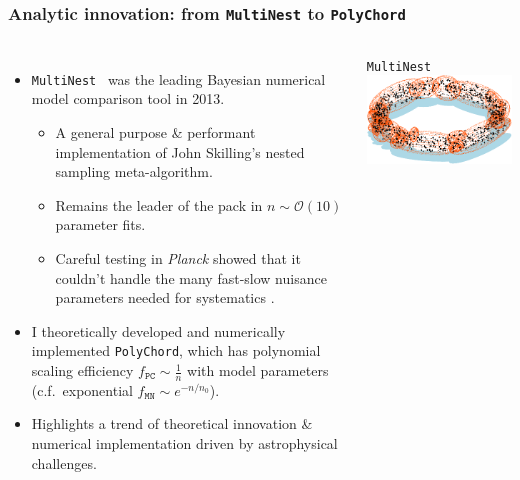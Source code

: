 \documentclass[aspectratio=169, handout]{beamer}
\begin{document}
\begin{frame}
    \frametitle{Analytic innovation: from \texttt{MultiNest} to \texttt{PolyChord}}
    \begin{columns}
        \begin{itemize}
            \item \texttt{MultiNest}~ was the leading Bayesian numerical model comparison tool in 2013.
                \begin{itemize}
                    \item A general purpose \& performant implementation of John Skilling's nested sampling meta-algorithm.
                    \item Remains the leader of the pack in $n\sim\mathcal{O}(10)$ parameter fits.
                    \item Careful testing in \textit{Planck} showed that it couldn't handle the many fast-slow nuisance parameters needed for systematics .
                \end{itemize}
            \item I theoretically developed and numerically implemented \texttt{PolyChord}, which has polynomial scaling efficiency $f_{\texttt{PC}}\sim \frac{1}{n}$ with model parameters (c.f.\ exponential $f_{\texttt{MN}}\sim e^{-n/n_0}$).
            \item Highlights a trend of theoretical innovation \& numerical implementation driven by astrophysical challenges.
        \end{itemize}
        \vspace{-10pt}
        \begin{block}{\texttt{MultiNest}~}
            \includegraphics[width=\textwidth]{figures/multinest.pdf}

\end{block}
\end{columns}
\end{frame}
\end{document}
